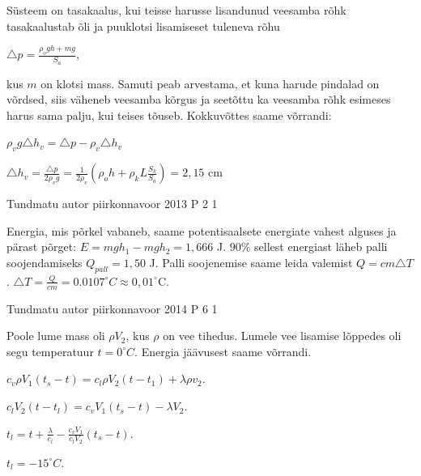 \documentclass[11pt]{article}
\begin{document}
{{\ifSolution
Süsteem on tasakaalus, kui teisse harusse lisandunud veesamba rõhk tasakaalustab õli ja puuklotsi lisamiseset tuleneva rõhu
\begin{center}
$\triangle p = \frac{\rho_o gh + mg}{S_a}$,
\end{center}
kus $m$ on klotsi mass. Samuti peab arvestama, et kuna harude pindalad on võrdsed, siis väheneb veesamba kõrgus ja seetõttu ka veesamba rõhk esimeses harus sama palju, kui teises tõuseb. Kokkuvõttes saame võrrandi: 
\begin{center}
$\rho_v g \triangle h_v = \triangle p - \rho_v \triangle h_v$
\end{center}
\begin{center}
$\triangle h_v = \frac{\triangle p}{2 \rho _v g} = \frac{1}{2\rho_v}(\rho_o h + \rho_k L\frac{S_k}{S_a}) = 2,15$ cm
\end{center}
\fi
}

{Tundmatu autor} %
{piirkonnavoor} %
{2013} %
{P 2} %
{1} %
{

\ifSolution
Energia, mis põrkel vabaneb, saame potentisaalsete energiate vahest alguses ja pärast põrget:
\newline
$E = mgh_1 - mgh_2 = 1,666$ J.
\newline
$90\%$ sellest energiast läheb palli soojendamiseks $Q_{pall} = 1,50$ J.
\newline
Palli soojenemise saame leida valemist $Q = cm\triangle T$.
\newline
$\triangle T = \frac{Q}{cm} = 0.0107 ^{\circ}C \approx 0,01 ^{\circ}$C.
\fi
}

{Tundmatu autor} %
{piirkonnavoor} %
{2014} %
{P 6} %
{1} %
{

\ifSolution
Poole lume mass oli $\rho V_2$, kus $\rho$ on vee tihedus. Lumele vee lisamise lõppedes oli segu temperatuur $t = 0^{\circ}C$.
Energia jäävusest saame võrrandi.
\begin{center}
$c_v\rho V_1 (t_s - t) = c_l \rho V_2 (t -t_1) + \lambda \rho v_2$.
\end{center}
\begin{center}
$c_l V_2 (t - t_l) = c_v V_1 (t_s - t) - \lambda V_2$.
\end{center}
\begin{center}
$t_l = t + \frac{\lambda}{c_l} - \frac{c_v V_1}{c_l V_2}(t_s - t)$.
\end{center}
\begin{center}
$t_l = - 15^{\circ}C$.
\end{center}
\fi
}

}
\end{document}
